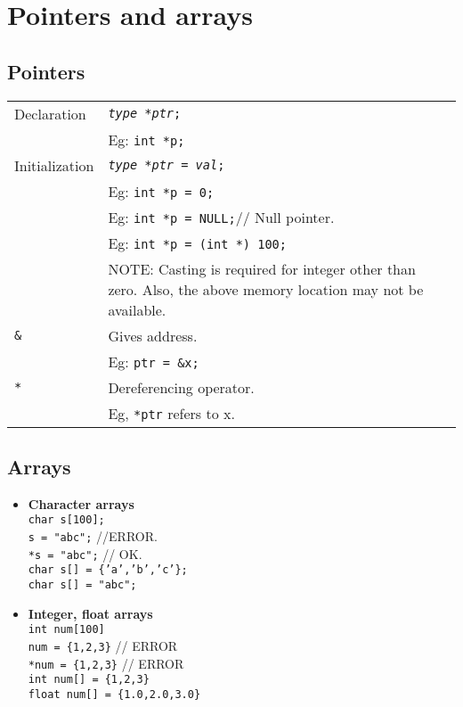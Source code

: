 \section{Pointers and arrays}

\subsection{Pointers}

\begin{tabularx}{\linewidth}{l|X}
\hline
Declaration & \texttt{\textit{type} *\textit{ptr};}\\
& Eg: \texttt{int *p;}\\
\hline
Initialization & \texttt{\textit{type *ptr = val};}\\
& Eg: \texttt{int *p = 0;}\\
& Eg: \texttt{int *p = NULL;}// Null pointer.\\
& Eg: \texttt{int *p = (int *) 100;}\\
& NOTE: Casting is required for integer other than zero. Also, the above memory location may not be available.\\
\hline
\texttt{\&} & Gives address.\\
& Eg: \texttt{ptr = \&x;}\\
\hline
\texttt{*} & Dereferencing operator.\\
& Eg, \texttt{*ptr} refers to x.\\
\hline
\end{tabularx}

\subsection{Arrays}

\begin{itemize}
\item \textbf{Character arrays}\\
\texttt{char s[100];}\\
\texttt{s = "abc";} //ERROR.\\
\texttt{*s = "abc";} // OK.\\
\texttt{char s[] = \{'a','b','c'\};}\\
\texttt{char s[] = "abc";}\\
\item \textbf{Integer, float arrays}\\
\texttt{int num[100]}\\
\texttt{num = \{1,2,3\}} // ERROR\\
\texttt{*num = \{1,2,3\}} // ERROR \\
\texttt{int num[] = \{1,2,3\}}\\
\texttt{float num[] = \{1.0,2.0,3.0\}}\\
\end{itemize}

